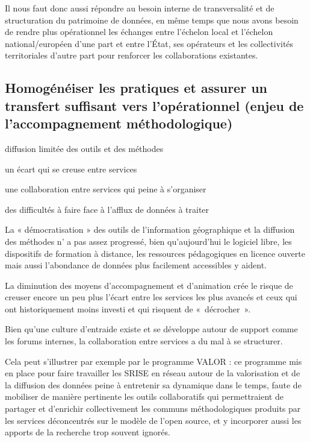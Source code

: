 Il nous faut donc aussi répondre au besoin interne de transversalité et de
structuration du patrimoine de données, en même temps que nous avons besoin de
rendre plus opérationnel les échanges entre l'échelon local et l'échelon
national/européen d'une part et entre l'État, ses opérateurs et les
collectivités territoriales d'autre part pour renforcer les collaborations
existantes.

\subsection[constats:homogeneisation]
{Homogénéiser les pratiques et assurer un transfert suffisant vers
l'opérationnel (enjeu de l'accompagnement méthodologique)}

\subject{Constats}

{\it

\startitemize[a,packed]

\item diffusion limitée des outils et des méthodes

\item un écart qui se creuse entre services

\item une collaboration entre services qui peine à s'organiser

\item des difficultés à faire face à l'afflux de données à traiter

\stopitemize}

La « démocratisation » des outils de
l'information géographique et la diffusion des méthodes n' a pas assez progressé,
bien qu'aujourd'hui le logiciel libre, les dispositifs de formation à distance, les ressources
pédagogiques en licence ouverte mais aussi l'abondance de données plus
facilement accessibles y aident.

La diminution des moyens d'accompagnement et d'animation crée le risque de
creuser encore un peu plus l'écart entre les services les plus avancés et ceux
qui ont historiquement moins investi et qui risquent de « décrocher ».

Bien qu'une culture d'entraide existe et se développe autour de support comme
les forums internes, la collaboration entre services a du mal à se structurer.

Cela peut s'illustrer par exemple par le programme VALOR : ce programme mis en
place pour faire travailler les SRISE en réseau autour de la valorisation et
de la diffusion des données peine à entretenir sa dynamique dans le temps,
faute de mobiliser de manière pertinente les outils collaboratifs qui
permettraient de partager et d'enrichir collectivement les communs
méthodologiques produits par les services déconcentrés sur le modèle de l'open
source, et y incorporer aussi les apports de la recherche trop souvent
ignorés.

